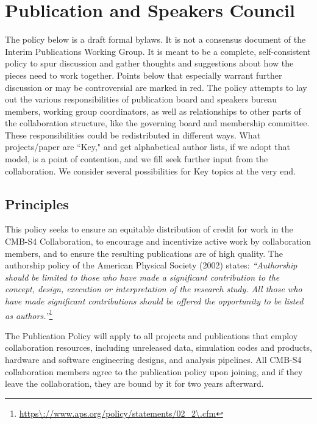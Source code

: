 \section{Publication and Speakers Council}
\label{sec:pub}



The policy below is a draft formal bylaws.  It is not a consensus document of the Interim Publications Working Group.  It is meant to be a complete, self-consistent policy to spur discussion and gather thoughts and suggestions about how the pieces need to work together. Points below that especially warrant further discussion or may be controversial are marked in red. The policy attempts to lay out the various responsibilities of publication board and speakers bureau members, working group coordinators, as well as relationships to other parts of the collaboration structure, like the governing board  and membership committee. These responsibilities could be redistributed in different ways. What projects/paper are ``Key," and get alphabetical author lists, if we adopt that model, is a point of contention, and we fill seek further input from the collaboration. We consider several possibilities for Key topics at the very end.


\subsection{Principles}
This policy seeks to ensure an equitable distribution of credit for work in the CMB-S4 Collaboration, to encourage and incentivize active work by collaboration members, and to ensure the resulting publications are of high quality. The authorship policy of the American Physical Society (2002) states: \textit{``Authorship should be limited to those who have made a significant contribution to the concept, design, execution or interpretation of the research study. All those who have made significant contributions should be offered the opportunity to be listed as authors.''}\footnote{\url{https\://www.aps.org/policy/statements/02\_2\.cfm}}

The Publication Policy will apply to all projects and publications that employ collaboration resources, including unreleased data, simulation codes and products, hardware and software
engineering designs, and analysis pipelines. All CMB-S4 collaboration members agree to the publication policy upon joining, and if they leave the collaboration, they are bound by it for two years afterward.

